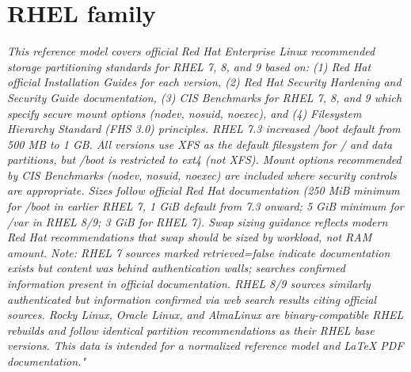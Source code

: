 \documentclass[10pt,a4paper]{article}
\begin{document}
\section{RHEL family}
\noindent\small\textit{This reference model covers official Red Hat Enterprise Linux recommended storage partitioning standards for RHEL 7, 8, and 9 based on: (1) Red Hat official Installation Guides for each version, (2) Red Hat Security Hardening and Security Guide documentation, (3) CIS Benchmarks for RHEL 7, 8, and 9 which specify secure mount options (nodev, nosuid, noexec), and (4) Filesystem Hierarchy Standard (FHS 3.0) principles. RHEL 7.3 increased /boot default from 500 MB to 1 GB. All versions use XFS as the default filesystem for / and data partitions, but /boot is restricted to ext4 (not XFS). Mount options recommended by CIS Benchmarks (nodev, nosuid, noexec) are included where security controls are appropriate. Sizes follow official Red Hat documentation (250 MiB minimum for /boot in earlier RHEL 7, 1 GiB default from 7.3 onward; 5 GiB minimum for /var in RHEL 8/9; 3 GiB for RHEL 7). Swap sizing guidance reflects modern Red Hat recommendations that swap should be sized by workload, not RAM amount. Note: RHEL 7 sources marked retrieved=false indicate documentation exists but content was behind authentication walls; searches confirmed information present in official documentation. RHEL 8/9 sources similarly authenticated but information confirmed via web search results citing official sources. Rocky Linux, Oracle Linux, and AlmaLinux are binary-compatible RHEL rebuilds and follow identical partition recommendations as their RHEL base versions. This data is intended for a normalized reference model and LaTeX PDF documentation."}\normalsize\par\medskip
\end{document}
